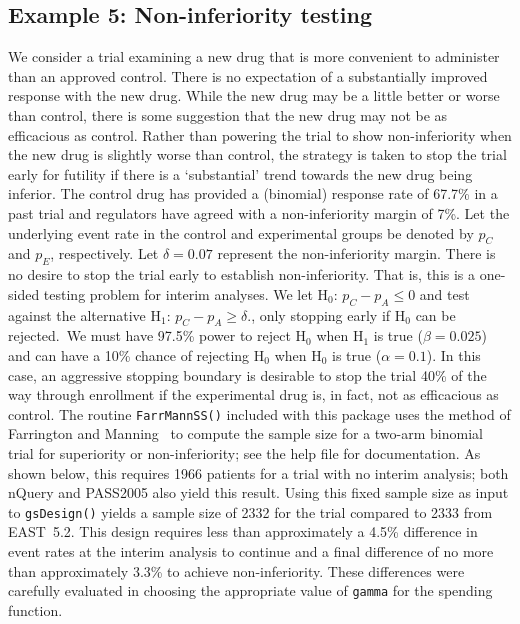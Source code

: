 \subsection*{Example 5: Non-inferiority testing }

We consider a trial examining a new drug that is more convenient to administer
than an approved control. There is no expectation of a substantially improved
response with the new drug. While the new drug may be a little better or
worse than control, there is some suggestion that the new drug may not be as
efficacious as control. Rather than powering the trial to show non-inferiority
when the new drug is slightly worse than control, the strategy is taken to
stop the trial early for futility if there is a `substantial' trend towards
the new drug being inferior. The control drug has provided a (binomial)
response rate of 67.7\% in a past trial and regulators have agreed with a
non-inferiority margin of 7\%. Let the underlying event rate in the control
and experimental groups be denoted by $p_{C}$ and $p_{E}$, respectively. Let
$\delta = 0.07$ represent the non-inferiority margin. There is no desire to stop
the trial early to establish non-inferiority. That is, this is a one-sided
testing problem for interim analyses. We let H$_{0}$: $p_{C}-p_{A}\leq0$ and
test against the alternative H$_{1}$: $p_{C}-p_{A}\geq\delta$., only stopping
early if H$_{0}$ can be rejected.\ We must have 97.5\% power to reject H$_{0}$
when H$_{1}$ is true ($\beta=0.025$) and can have a 10\% chance of rejecting
H$_{0}$ when H$_{0}$ is true ($\alpha=0.1$). In this case, an aggressive
stopping boundary is desirable to stop the trial 40\% of the way through
enrollment if the experimental drug is, in fact, not as efficacious as
control. The routine \texttt{FarrMannSS()} included with this package uses the
method of Farrington and Manning \cite{FarringtonManning}\ to compute the sample
size for a two-arm binomial trial for superiority or non-inferiority; see the
help file for documentation. As shown below, this requires 1966 patients for a
trial with no interim analysis; both nQuery and PASS2005 also yield this
result. Using this fixed sample size as input to \texttt{gsDesign()} yields a
sample size of 2332 for the trial compared to 2333 from EAST\ 5.2. This design
requires less than approximately a 4.5\% difference in event rates at the
interim analysis to continue and a final difference of no more than
approximately 3.3\% to achieve non-inferiority. These differences were
carefully evaluated in choosing the appropriate value of \texttt{gamma} for
the spending function.

